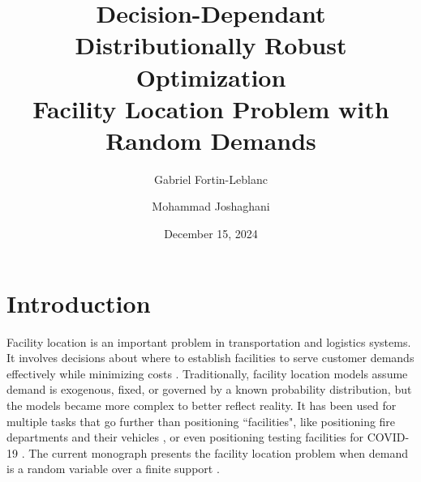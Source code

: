 \documentclass[12pt, letterpaper]{article}
\title{
	Decision-Dependant Distributionally Robust Optimization \\
	\large Facility Location Problem with Random Demands
}
\author[1]{Gabriel Fortin-Leblanc}
\author[2]{Mohammad Joshaghani}
\affil[1]{Université de Montréal}
\affil[2]{Université du Québec à Montréal}
\date{December 15, 2024}
\begin{document}
	\maketitle
	\tableofcontents
	\newpage
	
	\section*{Introduction}
	Facility location is an important problem in transportation and logistics systems. It involves decisions about where to establish facilities to serve customer demands effectively while minimizing costs \cite{cornuejols_uncapicitated_1983}. Traditionally, facility location models assume demand is exogenous, fixed, or governed by a known probability distribution, but the models became more complex to better reflect reality. It has been used for multiple tasks that go further than positioning ``facilities", like positioning fire departments and their vehicles \cite{rodriguez_simulation-optimization_2021}, or even positioning testing facilities for COVID-19 \cite{liu_testing_2023}. The current monograph presents the facility location problem when demand is a random variable over a finite support \cite{basciftci_distributionally_2021}. 
	
\end{document}
